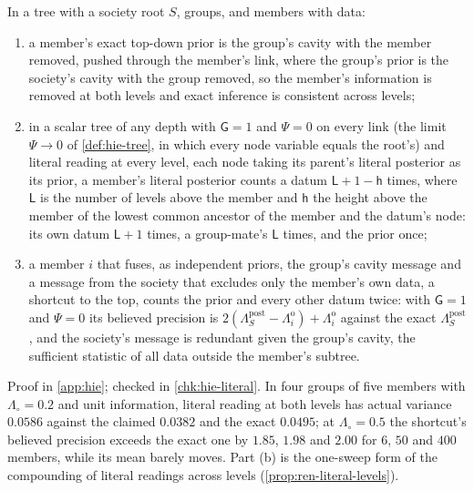\begin{proposition}\label{prop:hie-depth}
In a tree with a society root $S$, groups, and members with data:
\begin{enumerate}
\item[(a)] a member's exact top-down prior is the group's cavity with the member removed, pushed through the member's link, where the group's prior is the society's cavity with the group removed, so the member's information is removed at both levels and exact inference is consistent across levels;
\item[(b)] in a scalar tree of any depth with $\mathsf G=1$ and $\Psi=0$ on every link (the limit $\Psi\to0$ of \cref{def:hie-tree}, in which every node variable equals the root's) and literal reading at every level, each node taking its parent's literal posterior as its prior, a member's literal posterior counts a datum $\mathsf L+1-\mathsf h$ times, where $\mathsf L$ is the number of levels above the member and $\mathsf h$ the height above the member of the lowest common ancestor of the member and the datum's node: its own datum $\mathsf L+1$ times, a group-mate's $\mathsf L$ times, and the prior once;
\item[(c)] a member $i$ that fuses, as independent priors, the group's cavity message and a message from the society that excludes only the member's own data, a shortcut to the top, counts the prior and every other datum twice: with $\mathsf G=1$ and $\Psi=0$ its believed precision is $2(\Lambda^{\mathrm{post}}_S-\Lambda^{\mathrm o}_i)+\Lambda^{\mathrm o}_i$ against the exact $\Lambda^{\mathrm{post}}_S$, and the society's message is redundant given the group's cavity, the sufficient statistic of all data outside the member's subtree.
\end{enumerate}
\end{proposition}

Proof in \cref{app:hie}; checked in \cref{chk:hie-literal}. In four groups of five members with $\Lambda_\circ=0.2$ and unit information, literal reading at both levels has actual variance $0.0586$ against the claimed $0.0382$ and the exact $0.0495$; at $\Lambda_\circ=0.5$ the shortcut's believed precision exceeds the exact one by $1.85$, $1.98$ and $2.00$ for $6$, $50$ and $400$ members, while its mean barely moves. Part (b) is the one-sweep form of the compounding of literal readings across levels (\cref{prop:ren-literal-levels}).


